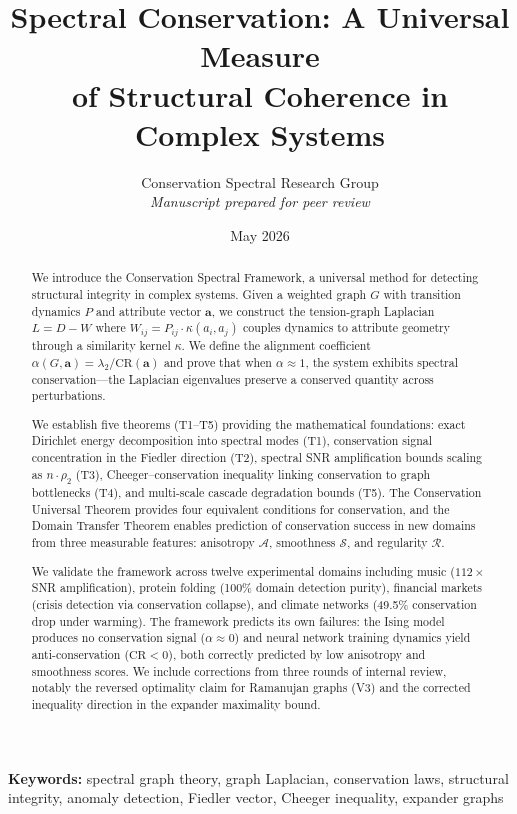 \documentclass[12pt,letterpaper]{article}
\title{\LARGE\bfseries Spectral Conservation: A Universal Measure\\[4pt] of Structural Coherence in Complex Systems}
\author{
  Conservation Spectral Research Group\\[4pt]
  \textit{Manuscript prepared for peer review}
}
\date{May 2026}
\newcommand{\bfa}{\mathbf{a}}
\newcommand{\CR}{\mathrm{CR}}
\newcommand{\cA}{\mathcal{A}}
\newcommand{\cS}{\mathcal{S}}
\newcommand{\cR}{\mathcal{R}}
\begin{document}
\maketitle

\begin{abstract}
We introduce the Conservation Spectral Framework, a universal method for detecting structural integrity in complex systems. Given a weighted graph $G$ with transition dynamics $P$ and attribute vector $\bfa$, we construct the tension-graph Laplacian $L = D - W$ where $W_{ij} = P_{ij} \cdot \kappa(a_i, a_j)$ couples dynamics to attribute geometry through a similarity kernel $\kappa$. We define the alignment coefficient $\alpha(G,\bfa) = \lambda_2 / \CR(\bfa)$ and prove that when $\alpha \approx 1$, the system exhibits spectral conservation---the Laplacian eigenvalues preserve a conserved quantity across perturbations.

We establish five theorems (T1--T5) providing the mathematical foundations: exact Dirichlet energy decomposition into spectral modes (T1), conservation signal concentration in the Fiedler direction (T2), spectral SNR amplification bounds scaling as $n \cdot \rho_2$ (T3), Cheeger--conservation inequality linking conservation to graph bottlenecks (T4), and multi-scale cascade degradation bounds (T5). The Conservation Universal Theorem provides four equivalent conditions for conservation, and the Domain Transfer Theorem enables prediction of conservation success in new domains from three measurable features: anisotropy $\cA$, smoothness $\cS$, and regularity $\cR$.

We validate the framework across twelve experimental domains including music ($112\times$ SNR amplification), protein folding (100\% domain detection purity), financial markets (crisis detection via conservation collapse), and climate networks (49.5\% conservation drop under warming). The framework predicts its own failures: the Ising model produces no conservation signal ($\alpha \approx 0$) and neural network training dynamics yield anti-conservation ($\CR < 0$), both correctly predicted by low anisotropy and smoothness scores. We include corrections from three rounds of internal review, notably the reversed optimality claim for Ramanujan graphs (V3) and the corrected inequality direction in the expander maximality bound.
\end{abstract}

\medskip
\noindent\textbf{Keywords:} spectral graph theory, graph Laplacian, conservation laws, structural integrity, anomaly detection, Fiedler vector, Cheeger inequality, expander graphs
\end{document}
